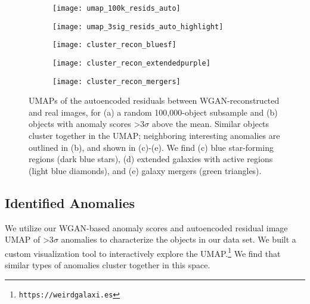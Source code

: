 \documentclass{article}
\begin{document}
\begin{figure}[t!]
\begin{subfigure}{.495\textwidth}
  \centering
  \texttt{[image: umap\_100k\_resids\_auto]}  
  \caption{}
  \label{fig:umap100k}
\end{subfigure}
\hfill
\vspace{0cm}
\begin{subfigure}{.495\textwidth}
  \centering
  \texttt{[image: umap\_3sig\_resids\_auto\_highlight]}  
  \caption{}
  \label{fig:umap3sig}
\end{subfigure}
\begin{subfigure}{.32\textwidth}
  \centering
  \texttt{[image: cluster\_recon\_bluesf]}  
  \caption{}
  \label{fig:bluesf}
\end{subfigure}
\hfill
\begin{subfigure}{.32\textwidth}
  \centering
  \texttt{[image: cluster\_recon\_extendedpurple]}  
  \caption{}
  \label{fig:extendedpurple}
\end{subfigure}
\hfill
\begin{subfigure}{.32\textwidth}
  \centering
  \texttt{[image: cluster\_recon\_mergers]}  
  \caption{}
  \label{fig:mergers}
\end{subfigure}
\vspace{0cm}
\caption{UMAPs of the autoencoded residuals between WGAN-reconstructed and real images, for (a) a random 100,000-object subsample and (b) objects with anomaly scores >3$\sigma$ above the mean. Similar objects cluster together in the UMAP; neighboring interesting anomalies are outlined in (b), and shown in (c)-(e). We find (c) blue star-forming regions (dark blue stars), (d) extended galaxies with active regions (light blue diamonds), and (e) galaxy mergers (green triangles).}
\label{fig:umap}
\end{figure}

\subsection{Identified Anomalies}

We utilize our WGAN-based anomaly scores and autoencoded residual image UMAP of >3$\sigma$ anomalies to characterize the objects in our data set.
We built a custom visualization tool to interactively explore the UMAP.\footnote{\texttt{https://weirdgalaxi.es}}
We find that similar types of anomalies cluster together in this space.
\end{document}
